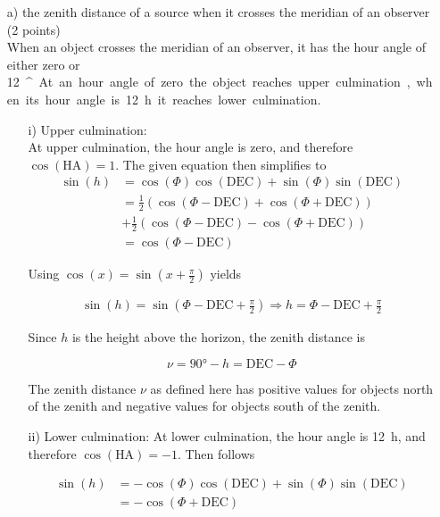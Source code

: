 \documentclass[11pt,a4paper,twoside]{article}
\begin{document}
\begin{enumerate}
 \item[a)] the zenith distance of a source when it crosses the meridian of an observer (2 points) \\
 When an object crosses the meridian of an observer, it has the hour angle of either zero or \SI{12}{^\hour}. At an hour angle of zero the object reaches upper culmination, when its hour angle is \SI{12}{\hour} it reaches lower culmination. 
 \begin{enumerate}
  \item[i)] Upper culmination: \\
  At upper culmination, the hour angle is zero, and therefore $\cos{ \left( \text{HA} \right)} = 1$. The given equation then simplifies to 
  \begin{align}
   \sin{ \left( h \right)} &= \cos{ \left( \Phi \right)} \cos{ \left( \text{DEC} \right)} + \sin{ \left( \Phi \right)} \sin{ \left( \text{DEC} \right)} \\
   &= \frac{1}{2} \left( \cos{ \left( \Phi - \text{DEC} \right)} + \cos{ \left( \Phi + \text{DEC} \right)} \right) \\ &+ \frac{1}{2} \left( \cos{ \left( \Phi - \text{DEC} \right)} - \cos{ \left( \Phi + \text{DEC} \right)} \right) \\
   &= \cos{ \left( \Phi - \text{DEC} \right)}
  \end{align}
  
  Using $\cos{ \left( x \right)} = \sin{ \left( x + \frac{\pi}{2} \right)}$ yields 
  
  \begin{align}
   \sin{ \left( h \right)} = \sin{ \left( \Phi - \text{DEC} + \frac{\pi}{2} \right)}
   \Rightarrow h = \Phi - \text{DEC} + \frac{\pi}{2}
  \end{align}
  
  Since $h$ is the height above the horizon, the zenith distance is 
  
  \begin{equation}
   \nu = \ang{90} - h = \text{DEC} - \Phi
  \end{equation}
  
  The zenith distance $\nu$ as defined here has positive values for objects north of the zenith and negative values for objects south of the zenith. \\
  \item[ii)] Lower culmination: 
  At lower culmination, the hour angle is \SI{12}{\hour}, and therefore $\cos{ \left( \text{HA} \right)} = -1$. Then follows 
  
  \begin{align}
   \sin{ \left( h \right)} &= -\cos{ \left( \Phi \right)} \cos{ \left( \text{DEC} \right)} + \sin{ \left( \Phi \right)} \sin{ \left( \text{DEC} \right)} \\
   &= -\cos{ \left( \Phi + \text{DEC} \right)}
  \end{align}

 \end{enumerate}

\end{enumerate}
\end{document}
